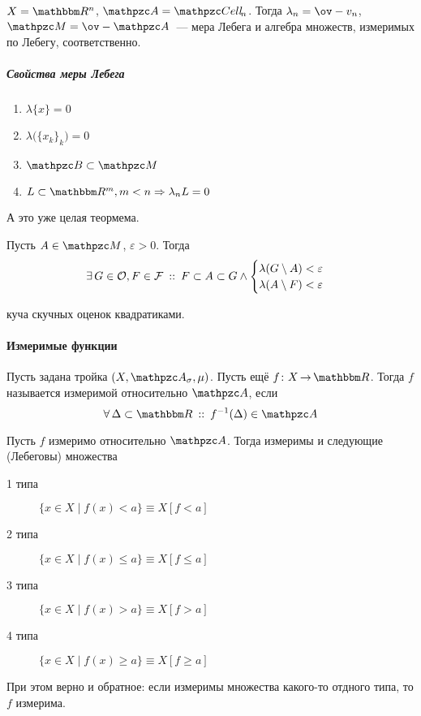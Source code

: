 \documentclass[12pt, timbord]{longnotes}
\begin{document}
\begin{defn}\label{defn:meas::ledeg::lebeg}
  $X=\R^n$, $\alg= \Cell_n$. Тогда $\lambda_n = \ov-{v_n}$, $\mathpzc M = \ov-{\alg}$~--- мера
  Лебега и алгебра множеств, измеримых по Лебегу, соответственно.
\end{defn}

\subparagraph{Свойства меры Лебега}

\begin{enumerate}[(1) $\triangleright$]
  \item $\lambda \{x\} = 0$
  \item $\lambda \bigl(\{x_k\}_{k}\bigr) = 0$
  \item $\borel \subset \lebesgue$
  \item $L \subset \R^m, m<n \Rightarrow \lambda_n L  = 0$
\end{enumerate}

А это уже целая теормема.
\begin{thrm}\label{thrm:meas::ledeg::reg}
  Пусть $A \in \lebesgue$, $\varepsilon > 0$. Тогда 
  \[
    \exists\, G \in \mathcal O, F \in \mathcal F \:::\: F \subset A \subset G \land 
    \begin{cases}
      \lambda(G \setminus A) < \varepsilon \\
      \lambda(A \setminus F) < \varepsilon 
    \end{cases}
  \]
\end{thrm}
\begin{tproof}
  куча скучных оценок квадратиками.
\end{tproof}



\paragraph{Измеримые функции}
\label{par:meas::mfun}

\begin{defn}\label{defn:meas::mfun}
  Пусть задана тройка $(X, \alg_\sigma, \mu)$. Пусть ещё $f\colon X \to \R$. Тогда 
  $f$ называется измеримой относительно $\alg$, если 
  \[
    \forall\, \Delta \subset \R  \holds f^{-1} (\Delta) \in \alg
  \]
\end{defn}

\begin{thrm}\label{thrm:meas::mfun::diftyps}
  Пусть $f$ измеримо относительно $\alg$. Тогда измеримы и следующие (Лебеговы) множества
  \begin{description}
    \item[1 типа] $\{x \in X \mid f(x) < a\} \equiv X [f < a]$
    \item[2 типа] $\{x \in X \mid f(x) \leqslant a\} \equiv X [f \leqslant a]$
    \item[3 типа] $\{x \in X \mid f(x) > a\} \equiv X [f > a]$
    \item[4 типа] $\{x \in X \mid f(x) \geqslant a\} \equiv X [f \geqslant a]$
  \end{description}
  При этом верно и обратное: если измеримы множества какого-то отдного типа, то
  $f$ измерима.
\end{thrm}
\end{document}
